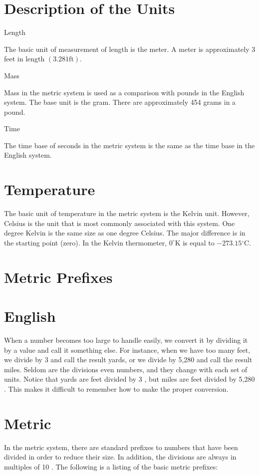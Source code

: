 \section{Description of the Units}
Length

The basic unit of measurement of length is the meter. A meter is approximately 3 feet in length $(3.281 \mathrm{ft})$.

Mass

Mass in the metric system is used as a comparison with pounds in the English system. The base unit is the gram. There are approximately 454 grams in a pound.

Time

The time base of seconds in the metric system is the same as the time base in the English system.

\section{Temperature}
The basic unit of temperature in the metric system is the Kelvin unit. However, Celsius is the unit that is most commonly associated with this system. One degree Kelvin is the same size as one degree Celsius. The major difference is in the starting point (zero). In the Kelvin thermometer, $0^{\circ} \mathrm{K}$ is equal to $-273.15{ }^{\circ} \mathrm{C}$.

\section{Metric Prefixes}
\section{English}
When a number becomes too large to handle easily, we convert it by dividing it by a value and call it something else. For instance, when we have too many feet, we divide by 3 and call the result yards, or we divide by 5,280 and call the result miles. Seldom are the divisions even numbers, and they change with each set of units. Notice that yards are feet divided by 3 , but miles are feet divided by 5,280 . This makes it difficult to remember how to make the proper conversion.

\section{Metric}
In the metric system, there are standard prefixes to numbers that have been divided in order to reduce their size. In addition, the divisions are always in multiples of 10 . The following is a listing of the basic metric prefixes:

